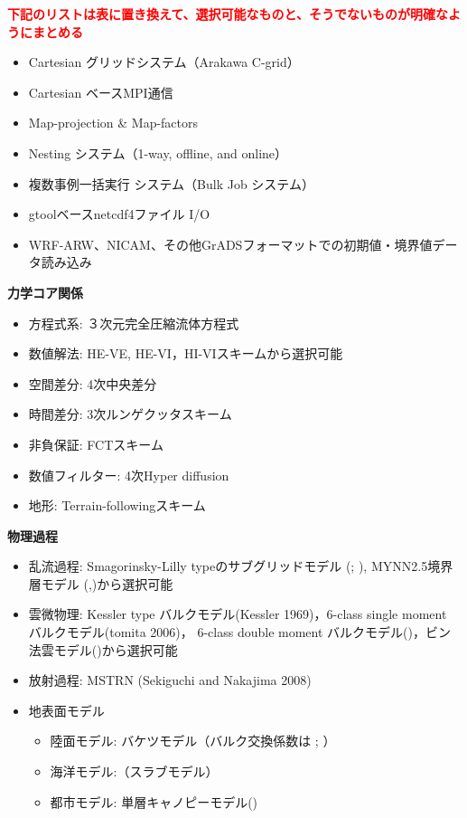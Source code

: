 \textcolor{red}{\bf 下記のリストは表に置き換えて、選択可能なものと、そうでないものが明確なようにまとめる}



\begin{itemize}
 \item Cartesian グリッドシステム（Arakawa C-grid）
 \item Cartesian ベースMPI通信
 \item Map-projection \& Map-factors
 \item Nesting システム（1-way, offline, and online）
 \item 複数事例一括実行 システム（Bulk Job システム）
 \item gtoolベースnetcdf4ファイル I/O
 \item WRF-ARW、NICAM、その他GrADSフォーマットでの初期値・境界値データ読み込み
\end{itemize}

{\bf 力学コア関係}

\begin{itemize}
 \item 方程式系: ３次元完全圧縮流体方程式
 \item 数値解法: HE-VE,  HE-VI，HI-VIスキームから選択可能
 \item 空間差分: 4次中央差分
 \item 時間差分: 3次ルンゲクッタスキーム
 \item 非負保証: FCTスキーム
 \item 数値フィルター: 4次Hyper diffusion
 \item 地形: Terrain-followingスキーム
\end{itemize}

{\bf 物理過程}

\begin{itemize}
 \item 乱流過程: Smagorinsky-Lilly typeのサブグリッドモデル (\cite{smagorinsky_1963}; \cite{lilly_1962}), 
MYNN2.5境界層モデル (\cite{my_1982},\cite{nakanishi_2004})から選択可能
 \item 雲微物理: Kessler type バルクモデル(Kessler 1969)，6-class single moment バルクモデル(tomita 2006)，
6-class double moment バルクモデル(\cite{sn_2014})，ビン法雲モデル(\cite{suzuki_etal_2010})から選択可能
 \item 放射過程: MSTRN (Sekiguchi and Nakajima 2008)
 \item 地表面モデル
  \begin{itemize}
   \item 陸面モデル: バケツモデル（バルク交換係数は \cite{beljaars_1991}; \cite{wilson_2001}）
   \item 海洋モデル:（スラブモデル）
   \item 都市モデル: 単層キャノピーモデル(\cite{kusaka_2001})
  \end{itemize}
\end{itemize}

